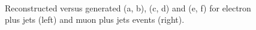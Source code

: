 \begin{figure}[hbtp]
	\hfill
	\\ 

	\caption{Reconstructed versus generated \MET (a, b), \HT (c, d) and \ST (e, f) for electron plus jets (left) and
	muon plus jets events (right).}
	\label{fig:choice_of_bins_1}
 \end{figure}

